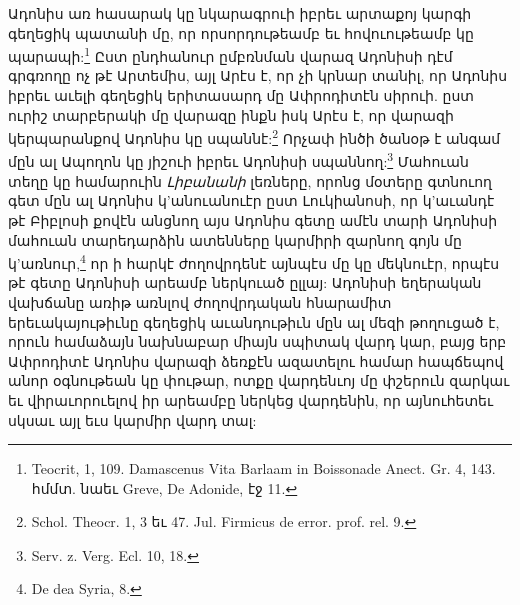 \documentclass{article}
\begin{document}
{Ադոնիս առ հասարակ կը նկարագրուի իբրեւ արտաքոյ կարգի գեղեցիկ պատանի մը, որ որսորդութեամբ եւ հովուութեամբ կը պարապի:\footnote{Teocrit, 1, 109. Damascenus Vita Barlaam in Boissonade Anect. Gr. 4, 143. հմմտ. նաեւ Greve, De Adonide, էջ 11.} Ըստ ընդհանուր ըմբռնման վարազ Ադոնիսի դէմ գրգռողը ոչ թէ Արտեմիս, այլ Արէս է, որ չի կրնար տանիլ, որ Ադոնիս իբրեւ աւելի գեղեցիկ երիտասարդ մը Ափրոդիտէն սիրուի. ըստ ուրիշ տարբերակի մը վարազը ինքն իսկ Արէս է, որ վարազի կերպարանքով Ադոնիս կը սպաննէ:\footnote{Schol. Theocr. 1, 3 եւ 47. Jul. Firmicus de error. prof. rel. 9.} Որչափ ինծի ծանօթ է անգամ մըն ալ Ապողոն կը յիշուի իբրեւ Ադոնիսի սպաննող:\footnote{Serv. z. Verg. Ecl. 10, 18.} Մահուան տեղը կը համարուին \emph{Լիբանանի} լեռները, որոնց մօտերը գտնուող գետ մըն ալ Ադոնիս կ'անուանուէր ըստ Լուկիանոսի, որ կ'աւանդէ թէ Բիբլոսի քովէն անցնող այս Ադոնիս գետը ամէն տարի Ադոնիսի մահուան տարեդարձին ատենները կարմիրի զարնող գոյն մը կ'առնուր,\footnote{De dea Syria, 8.} որ ի հարկէ ժողովրդենէ այնպէս մը կը մեկնուէր, որպէս թէ գետը Ադոնիսի արեամբ ներկուած ըլլայ: Ադոնիսի եղերական վախճանը առիթ առնլով ժողովրդական հնարամիտ երեւակայութիւնը գեղեցիկ աւանդութիւն մըն ալ մեզի թողուցած է, որուն համաձայն նախնաբար միայն սպիտակ վարդ կար, բայց երբ Ափրոդիտէ Ադոնիս վարազի ձեռքէն ազատելու համար հապճեպով անոր օգնութեան կը փութար, ոտքը վարդենւոյ մը փշերուն զարկաւ եւ վիրաւորուելով իր արեամբը ներկեց վարդենին, որ այնուհետեւ սկսաւ այլ եւս կարմիր վարդ տալ:

}
\end{document}
